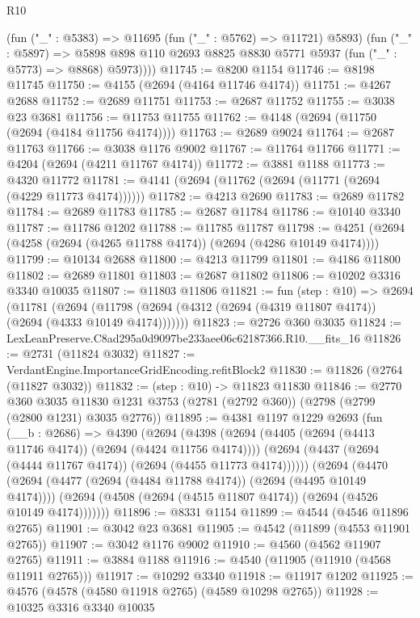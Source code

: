 \begin{lexlean}{R10}
\begin{coremodule}
          (fun ("_" : @5383) => @11695 (fun ("_" : @5762) => @11721) @5893)
          (fun ("_" : @5897) =>
          @5898 @898 @110 @2693 @8825 @8830 @5771 @5937 (fun ("_" : @5773) => @8868) @5973))))
@11745 := @8200 @1154
@11746 := @8198 @11745
@11750 := @4155 (@2694 (@4164 @11746 @4174))
@11751 := @4267 @2688
@11752 := @2689 @11751
@11753 := @2687 @11752
@11755 := @3038 @23 @3681
@11756 := @11753 @11755
@11762 := @4148 (@2694 (@11750 (@2694 (@4184 @11756 @4174))))
@11763 := @2689 @9024
@11764 := @2687 @11763
@11766 := @3038 @1176 @9002
@11767 := @11764 @11766
@11771 := @4204 (@2694 (@4211 @11767 @4174))
@11772 := @3881 @1188
@11773 := @4320 @11772
@11781 := @4141 (@2694 (@11762 (@2694 (@11771 (@2694 (@4229 @11773 @4174))))))
@11782 := @4213 @2690
@11783 := @2689 @11782
@11784 := @2689 @11783
@11785 := @2687 @11784
@11786 := @10140 @3340
@11787 := @11786 @1202
@11788 := @11785 @11787
@11798 := @4251 (@2694 (@4258 (@2694 (@4265 @11788 @4174)) (@2694 (@4286 @10149 @4174))))
@11799 := @10134 @2688
@11800 := @4213 @11799
@11801 := @4186 @11800
@11802 := @2689 @11801
@11803 := @2687 @11802
@11806 := @10202 @3316 @3340 @10035
@11807 := @11803 @11806
@11821 := fun (step : @10) =>
  @2694
    (@11781
      (@2694 (@11798 (@2694 (@4312 (@2694 (@4319 @11807 @4174)) (@2694 (@4333 @10149 @4174)))))))
@11823 := @2726 @360 @3035
@11824 := LexLeanPreserve.C8ad295a0d9097be233aee06c62187366.R10.__fits_16
@11826 := @2731 (@11824 @3032)
@11827 := VerdantEngine.ImportanceGridEncoding.refitBlock2
@11830 := @11826 (@2764 (@11827 @3032))
@11832 := (step : @10) -> @11823 @11830
@11846 := @2770
    @360
    @3035
    @11830
    @1231
    @3753
    (@2781 (@2792 @360))
    (@2798 (@2799 (@2800 @1231) @3035 @2776))
@11895 := @4381
    @1197
    @1229
    @2693
    (fun (__b : @2686) =>
    @4390
      (@2694
        (@4398
          (@2694 (@4405 (@2694 (@4413 @11746 @4174)) (@2694 (@4424 @11756 @4174))))
          (@2694 (@4437 (@2694 (@4444 @11767 @4174)) (@2694 (@4455 @11773 @4174))))))
      (@2694
        (@4470
          (@2694 (@4477 (@2694 (@4484 @11788 @4174)) (@2694 (@4495 @10149 @4174))))
          (@2694 (@4508 (@2694 (@4515 @11807 @4174)) (@2694 (@4526 @10149 @4174)))))))
@11896 := @8331 @1154
@11899 := @4544 (@4546 @11896 @2765)
@11901 := @3042 @23 @3681
@11905 := @4542 (@11899 (@4553 @11901 @2765))
@11907 := @3042 @1176 @9002
@11910 := @4560 (@4562 @11907 @2765)
@11911 := @3884 @1188
@11916 := @4540 (@11905 (@11910 (@4568 @11911 @2765)))
@11917 := @10292 @3340
@11918 := @11917 @1202
@11925 := @4576 (@4578 (@4580 @11918 @2765) (@4589 @10298 @2765))
@11928 := @10325 @3316 @3340 @10035

\end{coremodule}
\end{lexlean}
